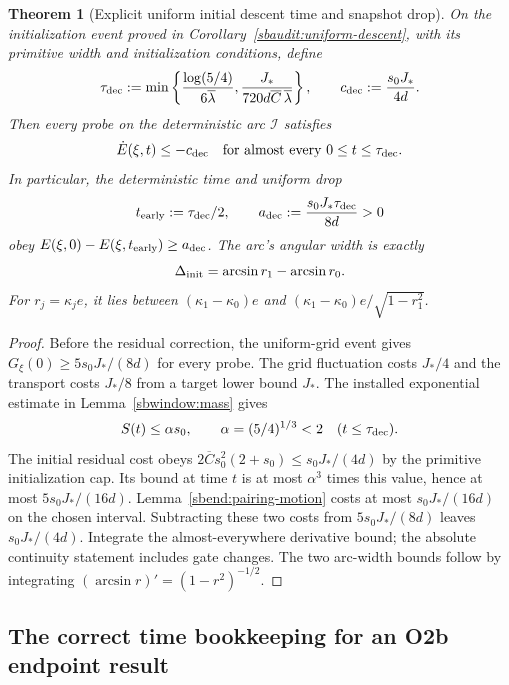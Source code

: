 \documentclass[11pt]{article}
\newtheorem{theorem}{Theorem}[section]
\theoremstyle{remark}
\begin{document}
\begin{theorem}[Explicit uniform initial descent time and snapshot drop]
\label{sbend:descent-clock}
On the initialization event proved in
Corollary~\ref{sbaudit:uniform-descent}, with its primitive width and
initialization conditions, define
\begin{equation}\label{sbend:tau-dec}
 \tau_{\rm dec}:=\min\left\{
 \frac{\log(5/4)}{6\overline\lambda},
 \frac{J_*}{720d\overline C\,\overline\lambda}\right\},
 \qquad c_{\rm dec}:=\frac{s_0J_*}{4d}.
\end{equation}
Then every probe on the deterministic arc $\mathcal I$ satisfies
\[
 \dot E(\xi,t)\le-c_{\rm dec}
 \quad\text{for almost every }0\le t\le\tau_{\rm dec}.
\]
In particular, the deterministic time and uniform drop
\begin{equation}\label{sbend:early-drop}
 t_{\rm early}:=\tau_{\rm dec}/2,\qquad
 a_{\rm dec}:=\frac{s_0J_*\tau_{\rm dec}}{8d}>0
\end{equation}
obey $E(\xi,0)-E(\xi,t_{\rm early})\ge a_{\rm dec}$.
The arc's angular width is exactly
\[
 \Delta_{\rm init}=\arcsin r_1-\arcsin r_0.
\]
For $r_j=\kappa_je$, it lies between
$(\kappa_1-\kappa_0)e$ and
$(\kappa_1-\kappa_0)e/\sqrt{1-r_1^2}$.
\end{theorem}
\begin{proof}
Before the residual correction, the uniform-grid event gives
$G_\xi(0)\ge5s_0J_*/(8d)$ for every probe. The grid fluctuation costs
$J_*/4$ and the transport costs $J_*/8$ from a target lower bound $J_*$.
The installed exponential estimate in Lemma~\ref{sbwindow:mass} gives
\[
 S(t)\le\alpha s_0,\qquad \alpha=(5/4)^{1/3}<2
 \quad(t\le\tau_{\rm dec}).
\]
The initial residual cost obeys
$2\overline C s_0^2(2+s_0)\le s_0J_*/(4d)$ by the primitive
initialization cap. Its bound at time $t$ is at most $\alpha^3$ times
this value, hence at most $5s_0J_*/(16d)$.
Lemma~\ref{sbend:pairing-motion} costs at most $s_0J_*/(16d)$ on the
chosen interval. Subtracting these two costs from $5s_0J_*/(8d)$ leaves
$s_0J_*/(4d)$. Integrate the almost-everywhere derivative bound; the
absolute continuity statement includes gate changes. The two arc-width
bounds follow by integrating $(\arcsin r)'=(1-r^2)^{-1/2}$.
\end{proof}

\subsection{The correct time bookkeeping for an O2b endpoint result}
\end{document}
